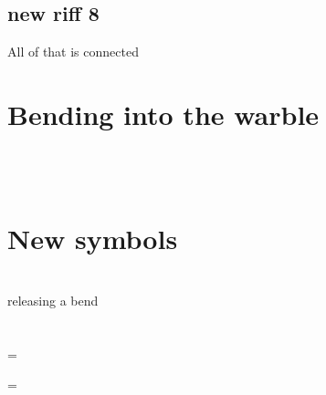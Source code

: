 \subsection{new riff 8}
All of that is connected
\e\4 \5 \\ \4\e\3\2





    \newpage

\section{Bending into the warble}
\fdb \4\5\4\5\4\5 \\

\warble
\\
\bendintowarble



\newpage
\section{New symbols} \\            
\nearrow releasing a bend \\

    \ffd \\
    \ffdb \\
    \ffdbrB = \ffdbr

    
    
    \4\5\4\5\textellipsis = \warble
    
    
    

